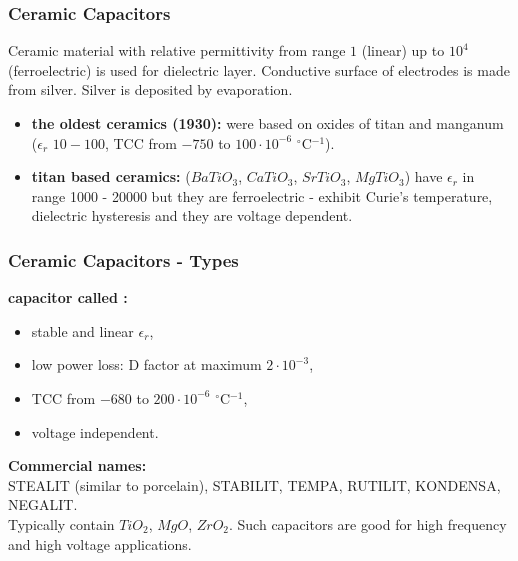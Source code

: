 \documentclass{beamer}
\begin{document}
	\begin{frame}
    \frametitle{Ceramic Capacitors}
		Ceramic material with relative permittivity from range $1$ (linear) up to $10^4$ (ferroelectric) is used for dielectric layer. Conductive surface of electrodes is made from silver. Silver is deposited by evaporation.
		
		\begin{itemize}
			\item \textbf{the oldest ceramics (1930):} were based on oxides of titan and manganum \\($\epsilon_r$ $10-100$, TCC from $-750$ to $100\cdot 10^{-6}$ $^\circ$C$^{-1}$).
			\item \textbf{titan based ceramics:} ($BaTiO_3$, $CaTiO_3$, $SrTiO_3$, $MgTiO_3$) have $\epsilon_r$ in range 1000 - 20000 but they are ferroelectric - exhibit Curie's temperature, dielectric hysteresis and they are voltage dependent.
		\end{itemize}
  \end{frame}
	\begin{frame}
    \frametitle{Ceramic Capacitors - Types}
		\textbf{capacitor called : }
		\begin{itemize}
			\item stable and linear $\epsilon_r$,
			\item low power loss: D factor at maximum $2\cdot 10^{-3}$,
			\item TCC from $-680$ to $200\cdot 10^{-6}$ $^\circ$C$^{-1}$,
			\item voltage independent.
		\end{itemize}
		\small
		\textbf{Commercial names:} \\STEALIT (similar to porcelain), STABILIT, TEMPA, RUTILIT, KONDENSA, NEGALIT. \\Typically contain $TiO_2$, $MgO$, $ZrO_2$. Such capacitors are good for high frequency and high voltage applications.

  \end{frame}
\end{document}
